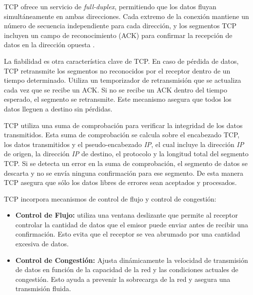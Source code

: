 TCP ofrece un servicio de \textit{full-duplex}, permitiendo que los datos fluyan simultáneamente en ambas direcciones. Cada extremo de la conexión mantiene un número de secuencia independiente para cada dirección, y los segmentos TCP incluyen un campo de reconocimiento (ACK) para confirmar la recepción de datos en la dirección opuesta \cite{tcpillustratedvol1}.

La fiabilidad es otra característica clave de TCP. En caso de pérdida de datos, TCP retransmite los segmentos no reconocidos por el receptor dentro de un tiempo determinado. Utiliza un temporizador de retransmisión que se actualiza cada vez que se recibe un ACK. Si no se recibe un ACK dentro del tiempo esperado, el segmento se retransmite. Este mecanismo asegura que todos los datos lleguen a destino sin pérdidas.

TCP utiliza una suma de comprobación para verificar la integridad de los datos transmitidos. Esta suma de comprobación se calcula sobre el encabezado TCP, los datos transmitidos y el pseudo-encabezado \textit{IP}, el cual incluye la dirección \textit{IP} de origen, la dirección \textit{IP} de destino, el protocolo y la longitud total del segmento TCP. Si se detecta un error en la suma de comprobación, el segmento de datos se descarta y no se envía ninguna confirmación para ese segmento. De esta manera TCP asegura que sólo los datos libres de errores sean aceptados y procesados.


TCP incorpora mecanismos de control de flujo y control de congestión:
\begin{itemize}
    \item \textbf{Control de Flujo: }utiliza una ventana deslizante que permite al receptor controlar la cantidad de datos que el emisor puede enviar antes de recibir una confirmación. Esto evita que el receptor se vea abrumado por una cantidad excesiva de datos.
    \item \textbf{Control de Congestión: }Ajusta dinámicamente la velocidad de transmisión de datos en función de la capacidad de la red y las condiciones actuales de congestión. Esto ayuda a prevenir la sobrecarga de la red y asegura una transmisión fluida.
\end{itemize}















